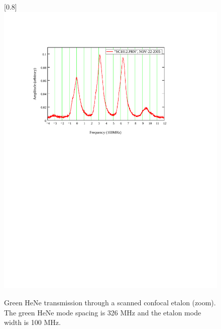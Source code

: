 \begin{figure}
\scalebox{0.8}[0.8]{
\includegraphics[bb=15 440 489 752]
{confocal_zoom/confocal_zoom.pdf}
}
\caption[Green HeNe transmission through a scanned confocal etalon (zoom)]{Green HeNe transmission through a scanned confocal etalon (zoom). The green HeNe mode spacing is 326 MHz and the etalon mode width is 100 MHz.}
\label{confocal_zoom}
\end{figure}
